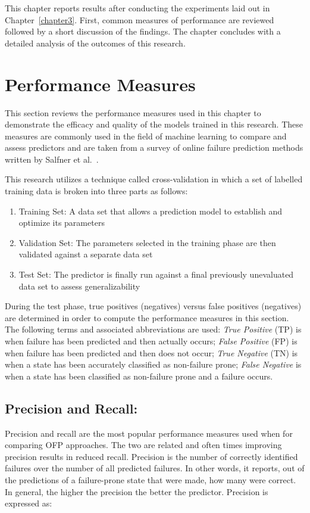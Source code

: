 This chapter reports results after conducting the experiments laid out in
Chapter~\ref{chapter3}.  First, common measures of performance are reviewed
followed by a short discussion of the findings.  The chapter concludes with a
detailed analysis of the outcomes of this research.

\section{Performance Measures} \label{metrics}
This section reviews the performance measures used in this chapter to
demonstrate the efficacy and quality of the models trained in this research.
These measures are commonly used in the field of machine learning to compare
and assess predictors and are taken from a survey of online failure prediction
methods written by Salfner et al.~\cite{salfnerSurvey}.

This research utilizes a technique called cross-validation in which a set of
labelled training data is broken into three parts as follows:
\begin{enumerate}
\item{Training Set:  A data set that allows a prediction model to establish and
optimize its parameters}
\item{Validation Set:  The parameters selected in the training phase are then
validated against a separate data set}
\item{Test Set:  The predictor is finally run against a final previously
unevaluated data set to assess generalizability}
\end{enumerate}
During the test phase, true positives (negatives) versus false positives
(negatives) are determined in order to compute the performance measures in
this section.  The following terms and associated abbreviations are used:
\emph{True Positive} (TP) is when failure has been predicted and then actually
occurs; \emph{False Positive} (FP) is when failure has been predicted and then
does not occur; \emph{True Negative} (TN) is when a state has been accurately
classified as non-failure prone; \emph{False Negative} is when a state has been
classified as non-failure prone and a failure occurs.

\subsection{Precision and Recall:}
Precision and recall are the most popular performance measures used when
for comparing OFP approaches.  The two are related and often times
improving precision results in reduced recall.  Precision is the number of
correctly identified failures over the number of all predicted failures.  In
other words, it reports, out of the predictions of a failure-prone state that
were made, how many were correct.  In general, the higher the precision the
better the predictor.  Precision is expressed as:

